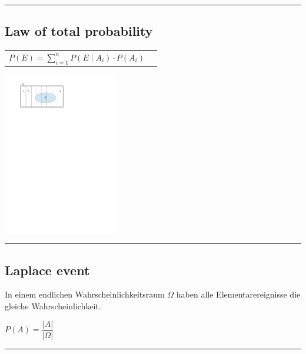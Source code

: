	\vspace{2mm}
	\hrule
	\vspace{3mm}

\subsection{Law of total probability }
  \begin{minipage}{10cm}
	  \begin{tabular}{ll}
			$P(E)=\sum\limits_{i=1}^n P(E\mid A_i)\cdot P(A_i)$
	  \end{tabular}
  \end{minipage} 
  \begin{minipage}{10cm}
  	\includegraphics[width=5cm]{./Content/EreignisseWahrscheinlichkeit/total_probability.pdf}
  \end{minipage}
	
	\vspace{2mm}
	\hrule
	\vspace{3mm}
				
\subsection{Laplace event}
		In einem endlichen Wahrscheinlichkeitsraum $\Omega$ haben alle
		Elementarereignisse die gleiche Wahrscheinlichkeit.
		\begin{center}
		$P(A)=\dfrac{\left| A\right|}{\left|\Omega\right|}$
		\end{center}
		
	\vspace{2mm}
	\hrule
	\vspace{3mm}

\vfill
\newpage
	
	
